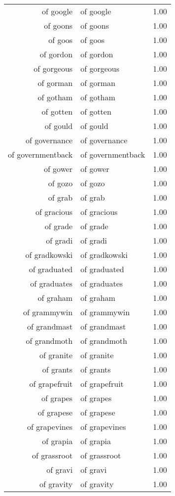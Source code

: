 \begin{table}[ht]
\begin{tabular}{rlr}
  of google & of google & 1.00 \\ 
  of goons & of goons & 1.00 \\ 
  of goos & of goos & 1.00 \\ 
  of gordon & of gordon & 1.00 \\ 
  of gorgeous & of gorgeous & 1.00 \\ 
  of gorman & of gorman & 1.00 \\ 
  of gotham & of gotham & 1.00 \\ 
  of gotten & of gotten & 1.00 \\ 
  of gould & of gould & 1.00 \\ 
  of governance & of governance & 1.00 \\ 
  of governmentback & of governmentback & 1.00 \\ 
  of gower & of gower & 1.00 \\ 
  of gozo & of gozo & 1.00 \\ 
  of grab & of grab & 1.00 \\ 
  of gracious & of gracious & 1.00 \\ 
  of grade & of grade & 1.00 \\ 
  of gradi & of gradi & 1.00 \\ 
  of gradkowski & of gradkowski & 1.00 \\ 
  of graduated & of graduated & 1.00 \\ 
  of graduates & of graduates & 1.00 \\ 
  of graham & of graham & 1.00 \\ 
  of grammywin & of grammywin & 1.00 \\ 
  of grandmast & of grandmast & 1.00 \\ 
  of grandmoth & of grandmoth & 1.00 \\ 
  of granite & of granite & 1.00 \\ 
  of grants & of grants & 1.00 \\ 
  of grapefruit & of grapefruit & 1.00 \\ 
  of grapes & of grapes & 1.00 \\ 
  of grapese & of grapese & 1.00 \\ 
  of grapevines & of grapevines & 1.00 \\ 
  of grapia & of grapia & 1.00 \\ 
  of grassroot & of grassroot & 1.00 \\ 
  of gravi & of gravi & 1.00 \\ 
  of gravity & of gravity & 1.00 \\ 

\end{tabular}
\end{table}
